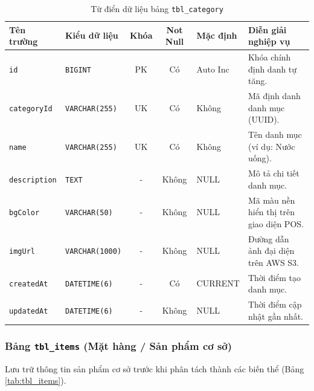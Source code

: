 \begin{table}[htbp]
\centering
\caption{Từ điển dữ liệu bảng \texttt{tbl\_category}}
\label{tab:tbl_category}
\vspace{2mm}
\begin{tabularx}{\textwidth}{|p{2.5cm}|p{2.8cm}|c|c|p{1.8cm}|X|}
\hline
\textbf{Tên trường} & \textbf{Kiểu dữ liệu} & \textbf{Khóa} & \textbf{Not Null} & \textbf{Mặc định} & \textbf{Diễn giải nghiệp vụ} \\ \hline
\texttt{id} & \texttt{BIGINT} & PK & Có & Auto Inc & Khóa chính định danh tự tăng. \\ \hline
\texttt{categoryId} & \texttt{VARCHAR(255)} & UK & Có & Không & Mã định danh danh mục (UUID). \\ \hline
\texttt{name} & \texttt{VARCHAR(255)} & UK & Có & Không & Tên danh mục (ví dụ: Nước uống). \\ \hline
\texttt{description} & \texttt{TEXT} & - & Không & NULL & Mô tả chi tiết danh mục. \\ \hline
\texttt{bgColor} & \texttt{VARCHAR(50)} & - & Không & NULL & Mã màu nền hiển thị trên giao diện POS. \\ \hline
\texttt{imgUrl} & \texttt{VARCHAR(1000)} & - & Không & NULL & Đường dẫn ảnh đại diện trên AWS S3. \\ \hline
\texttt{createdAt} & \texttt{DATETIME(6)} & - & Có & CURRENT & Thời điểm tạo danh mục. \\ \hline
\texttt{updatedAt} & \texttt{DATETIME(6)} & - & Không & NULL & Thời điểm cập nhật gần nhất. \\ \hline
\end{tabularx}
\end{table}

\subsubsection{Bảng \texttt{tbl\_items} (Mặt hàng / Sản phẩm cơ sở)}
Lưu trữ thông tin sản phẩm cơ sở trước khi phân tách thành các biến thể (Bảng \ref{tab:tbl_items}).

